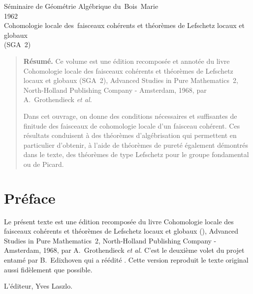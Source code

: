
 {S\'eminaire de G\'eom\'etrie Alg\'ebrique du~Bois~Marie \\
1962 \\
Cohomologie locale des~faisceaux coh\'erents et th\'eor\`emes de Lefschetz locaux et globaux \\(SGA~2)}





\begin{quote}\textbf{Résumé.} 
Ce volume est une \'edition recompos\'ee et annot\'ee du livre \og Cohomologie locale des faisceaux coh\'erents et th\'eor\`emes de Lefschetz locaux et globaux (SGA~2)\fg, Advanced Studies in Pure Mathematics~2, North-Holland Publishing Company - Amsterdam, 1968, par A.~Grothendieck \textit{et al.}

Dans cet ouvrage, on donne des conditions n\'ecessaires et suffisantes de finitude des faisceaux de cohomologie locale d'un faisceau coh\'erent. Ces r\'esultats conduisent \`a des th\'eor\`emes d'alg\'ebrisation qui permettent en particulier d'obtenir, \`a l'aide de th\'eor\`emes de puret\'e \'egalement d\'emontr\'es dans le texte, des th\'eor\`emes de type Lefschetz pour le groupe fondamental ou de Picard.
\end{quote}










\cleardoublepage
\renewcommand{\baselinestretch}{1.1}\normalfont
\chapter*{Pr\'eface}
\thispagestyle{empty}
Le pr\'esent texte est une \'edition recompos\'ee \ignorespaces du livre \og Cohomologie locale des faisceaux coh\'erents et th\'eor\`emes de Lefschetz locaux et globaux ()\fg, Advanced Studies in Pure Mathematics~2, North-Holland Publishing Company - Amsterdam, 1968, par A.\, Grothendieck \textit{et al.} C'est le deuxi\`eme volet du projet entam\'e par B.\, Edixhoven qui a r\'e\'edit\'e . Cette version reproduit le texte original aussi fid\`element que possible.

\bigskip
\begin{flushright}
L'\'editeur, Yves Laszlo.
\end{flushright}


